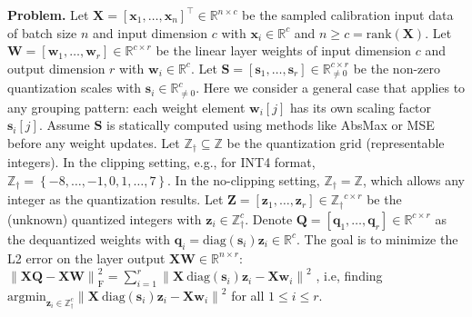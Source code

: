 \documentclass{article} %
\begin{document}
\textbf{Problem.}
Let $\bm{X} = \left[ \bm{x}_{1}, \dots, \bm{x}_{n} \right]^\top \in \mathbb{R}^{n \times c}$ be the sampled calibration input data of batch size $n$ and input dimension $c$ with $\bm{x}_{i} \in \mathbb{R}^{c}$ and $n \ge c = \mathrm{rank} \left( \bm{X} \right)$.
Let $\bm{W} = \left[ \bm{w}_{1}, \dots, \bm{w}_{r} \right] \in \mathbb{R}^{c \times r}$ be the linear layer weights of input dimension $c$ and output dimension $r$ with $\bm{w}_{i} \in \mathbb{R}^{c}$.
Let $\bm{S} = \left[ \bm{s}_{1}, \dots, \bm{s}_{r} \right] \in \mathbb{R}_{\ne 0}^{c \times r}$ be the non-zero quantization scales with $\bm{s}_{i} \in \mathbb{R}_{\ne 0}^{c}$. Here we consider a general case that applies to any grouping pattern: each weight element $\bm{w}_{i} [j]$ has its own scaling factor $\bm{s}_{i} [j]$. Assume $\bm{S}$ is statically computed using methods like AbsMax or MSE before any weight updates.
Let $\mathbb{Z}_{\dagger} \subseteq \mathbb{Z}$ be the quantization grid (representable integers). In the clipping setting, e.g., for INT4 format, $\mathbb{Z}_{\dagger} = \left\{ -8, \dots, -1, 0, 1, \dots, 7 \right\}$. In the no-clipping setting, $\mathbb{Z}_{\dagger} = \mathbb{Z}$, which allows any integer as the quantization results.
Let $\bm{Z} = \left[ \bm{z}_{1}, \dots, \bm{z}_{r} \right] \in {\mathbb{Z}_{\dagger}}^{c \times r}$ be the (unknown) quantized integers with $\bm{z}_{i} \in \mathbb{Z}_{\dagger}^{c}$.
Denote $\bm{Q} = \left[ \bm{q}_{1}, \dots, \bm{q}_{r} \right] \in \mathbb{R}^{c \times r}$ as the dequantized weights with $\bm{q}_{i} = \mathrm{diag} \left( {\bm{s}_{i}} \right) \bm{z}_{i} \in \mathbb{R}^{c}$.
The goal is to minimize the L2 error on the layer output $\bm{X} \bm{W} \in \mathbb{R}^{n \times r}$:
$\left\| \bm{X} \bm{Q} - \bm{X} \bm{W} \right\|_{\mathrm{F}}^{2} = \sum_{i=1}^{r} \left\| \bm{X} \mathrm{\ diag} \left( {\bm{s}_{i}} \right) \bm{z}_{i} - \bm{X} \bm{w}_{i} \right\|^{2}$
, i.e, finding 
$\mathrm{argmin}_{\bm{z}_{i} \in \mathbb{Z}_{\dagger}^{c}} \left\| \bm{X} \mathrm{\ diag} \left( {\bm{s}_{i}} \right) \bm{z}_{i} - \bm{X} \bm{w}_{i} \right\|^{2}$ for all $1 \le i \le r$.
\end{document}
